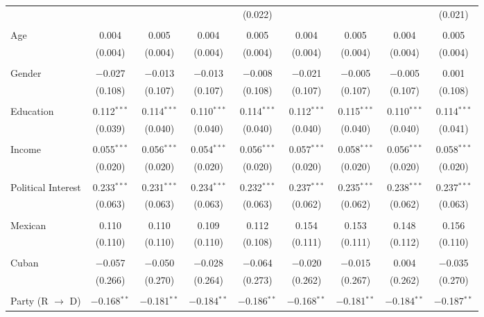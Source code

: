 \begin{table}[!htbp]
\begin{tabular}{@{\extracolsep{5pt}}lcccccccc}
  &  &  &  & (0.022) &  &  &  & (0.021) \\ 
  & & & & & & & & \\ 
 Age & 0.004 & 0.005 & 0.004 & 0.005 & 0.004 & 0.005 & 0.004 & 0.005 \\ 
  & (0.004) & (0.004) & (0.004) & (0.004) & (0.004) & (0.004) & (0.004) & (0.004) \\ 
  & & & & & & & & \\ 
 Gender & $-$0.027 & $-$0.013 & $-$0.013 & $-$0.008 & $-$0.021 & $-$0.005 & $-$0.005 & 0.001 \\ 
  & (0.108) & (0.107) & (0.107) & (0.108) & (0.107) & (0.107) & (0.107) & (0.108) \\ 
  & & & & & & & & \\ 
 Education & 0.112$^{***}$ & 0.114$^{***}$ & 0.110$^{***}$ & 0.114$^{***}$ & 0.112$^{***}$ & 0.115$^{***}$ & 0.110$^{***}$ & 0.114$^{***}$ \\ 
  & (0.039) & (0.040) & (0.040) & (0.040) & (0.040) & (0.040) & (0.040) & (0.041) \\ 
  & & & & & & & & \\ 
 Income & 0.055$^{***}$ & 0.056$^{***}$ & 0.054$^{***}$ & 0.056$^{***}$ & 0.057$^{***}$ & 0.058$^{***}$ & 0.056$^{***}$ & 0.058$^{***}$ \\ 
  & (0.020) & (0.020) & (0.020) & (0.020) & (0.020) & (0.020) & (0.020) & (0.020) \\ 
  & & & & & & & & \\ 
 Political Interest & 0.233$^{***}$ & 0.231$^{***}$ & 0.234$^{***}$ & 0.232$^{***}$ & 0.237$^{***}$ & 0.235$^{***}$ & 0.238$^{***}$ & 0.237$^{***}$ \\ 
  & (0.063) & (0.063) & (0.063) & (0.063) & (0.062) & (0.062) & (0.062) & (0.063) \\ 
  & & & & & & & & \\ 
 Mexican & 0.110 & 0.110 & 0.109 & 0.112 & 0.154 & 0.153 & 0.148 & 0.156 \\ 
  & (0.110) & (0.110) & (0.110) & (0.108) & (0.111) & (0.111) & (0.112) & (0.110) \\ 
  & & & & & & & & \\ 
 Cuban & $-$0.057 & $-$0.050 & $-$0.028 & $-$0.064 & $-$0.020 & $-$0.015 & 0.004 & $-$0.035 \\ 
  & (0.266) & (0.270) & (0.264) & (0.273) & (0.262) & (0.267) & (0.262) & (0.270) \\ 
  & & & & & & & & \\ 
 Party (R $\longrightarrow$ D) & $-$0.168$^{**}$ & $-$0.181$^{**}$ & $-$0.184$^{**}$ & $-$0.186$^{**}$ & $-$0.168$^{**}$ & $-$0.181$^{**}$ & $-$0.184$^{**}$ & $-$0.187$^{**}$ \\ 

\end{tabular}
\end{table}
